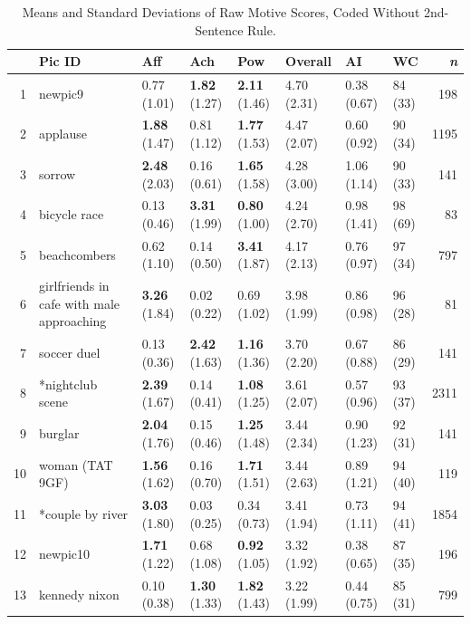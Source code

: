 \documentclass[man,a4paper,mask]{apa6}\usepackage[]{graphicx}\usepackage[]{color}
\begin{document}
\begin{table}
	\begin{threeparttable}
		\caption{Means and Standard Deviations of Raw Motive Scores, Coded Without 2nd-Sentence Rule.}
		\label{tab:norms}
		\small
		\begin{tabularx}{\textwidth}{rlllllllr}
		\toprule
 & Pic ID & Aff & Ach & Pow & Overall & AI & WC & \emph{n} \\ 
  \hline
  1 & newpic9 & 0.77 (1.01) & \textbf{1.82} (1.27) & \textbf{2.11} (1.46) & 4.70 (2.31) & 0.38 (0.67) & 84 (33) & 198 \\ 
    2 & applause & \textbf{1.88} (1.47) & 0.81 (1.12) & \textbf{1.77} (1.53) & 4.47 (2.07) & 0.60 (0.92) & 90 (34) & 1195 \\ 
    3 & sorrow & \textbf{2.48} (2.03) & 0.16 (0.61) & \textbf{1.65} (1.58) & 4.28 (3.00) & 1.06 (1.14) & 90 (33) & 141 \\ 
    4 & bicycle race & 0.13 (0.46) & \textbf{3.31} (1.99) & \textbf{0.80} (1.00) & 4.24 (2.70) & 0.98 (1.41) & 98 (69) &  83 \\ 
    5 & beachcombers & 0.62 (1.10) & 0.14 (0.50) & \textbf{3.41} (1.87) & 4.17 (2.13) & 0.76 (0.97) & 97 (34) & 797 \\ 
    6 & girlfriends in cafe with male approaching & \textbf{3.26} (1.84) & 0.02 (0.22) & 0.69 (1.02) & 3.98 (1.99) & 0.86 (0.98) & 96 (28) &  81 \\ 
    7 & soccer duel & 0.13 (0.36) & \textbf{2.42} (1.63) & \textbf{1.16} (1.36) & 3.70 (2.20) & 0.67 (0.88) & 86 (29) & 141 \\ 
    8 & *nightclub scene & \textbf{2.39} (1.67) & 0.14 (0.41) & \textbf{1.08} (1.25) & 3.61 (2.07) & 0.57 (0.96) & 93 (37) & 2311 \\ 
    9 & burglar & \textbf{2.04} (1.76) & 0.15 (0.46) & \textbf{1.25} (1.48) & 3.44 (2.34) & 0.90 (1.23) & 92 (31) & 141 \\ 
   10 & woman (TAT 9GF) & \textbf{1.56} (1.62) & 0.16 (0.70) & \textbf{1.71} (1.51) & 3.44 (2.63) & 0.89 (1.21) & 94 (40) & 119 \\ 
   11 & *couple by river & \textbf{3.03} (1.80) & 0.03 (0.25) & 0.34 (0.73) & 3.41 (1.94) & 0.73 (1.11) & 94 (41) & 1854 \\ 
   12 & newpic10 & \textbf{1.71} (1.22) & 0.68 (1.08) & \textbf{0.92} (1.05) & 3.32 (1.92) & 0.38 (0.65) & 87 (35) & 196 \\ 
   13 & kennedy nixon & 0.10 (0.38) & \textbf{1.30} (1.33) & \textbf{1.82} (1.43) & 3.22 (1.99) & 0.44 (0.75) & 85 (31) & 799 \\ 

\end{tabularx}
\end{threeparttable}
\end{table}
\end{document}

